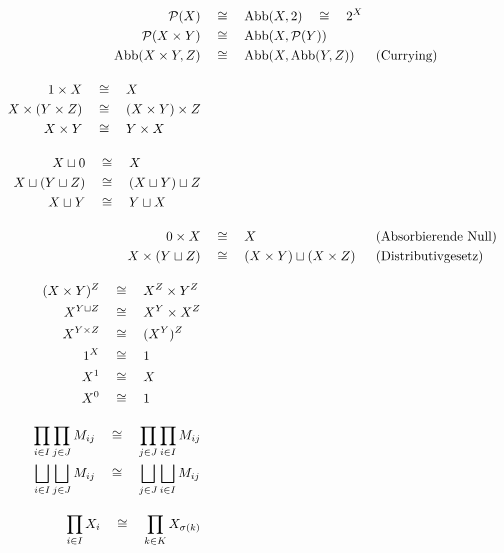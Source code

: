 \begin{align*}
    \calP(X) & \quad\cong\quad \Abb(X,2) \quad\cong\quad 2^X \\
    \calP(X\times Y) & \quad\cong\quad \Abb(X,\calP(Y)) \\
    \Abb(X\times Y,Z) & \quad\cong\quad \Abb(X,\Abb(Y,Z)) && (\text{Currying}) \\[1em]
    \begin{split}
        1 \times X & \quad\cong\quad X \\
        X\times (Y\times Z) & \quad\cong\quad (X\times Y) \times Z \\
        X\times Y & \quad\cong\quad Y\times X
    \end{split} \\[1em]
    \begin{split}
        X\sqcup 0 & \quad\cong\quad X \\
        X \sqcup ( Y\sqcup Z) & \quad\cong\quad (X\sqcup Y)\sqcup Z \\
        X \sqcup Y & \quad\cong\quad Y\sqcup X
    \end{split} \\[1em]
        0 \times X & \quad\cong\quad X && (\text{Absorbierende Null}) \\
        X \times (Y\sqcup Z) & \quad\cong\quad (X\times Y)\sqcup (X\times Z) && (\text{Distributivgesetz}) \\[1em]
    \begin{split}
        (X\times Y)^Z & \quad\cong\quad X^Z \times Y^Z \\
        X^{Y\sqcup Z} & \quad\cong\quad X^Y \times X^Z \\
        X^{Y\times Z} & \quad\cong\quad (X^Y)^Z \\
        1^X & \quad\cong\quad 1 \\
        X^1 & \quad\cong\quad X \\
        X^0 & \quad\cong\quad 1
    \end{split} \\[1em]
    \begin{split}
        \prod_{i\in I} \prod_{j\in J} M_{ij} & \quad\cong\quad \prod_{j\in J} \prod_{i\in I} M_{ij} \\
        \bigsqcup_{i\in I} \bigsqcup_{j\in J} M_{ij} & \quad\cong\quad \bigsqcup_{j\in J} \bigsqcup_{i\in I} M_{ij}
    \end{split} \\[1em]
    \begin{split}
    \prod_{i\in I} X_i & \quad\cong\quad \prod_{k\in K} X_{\sigma(k)} \\

\end{split}
\end{align*}
